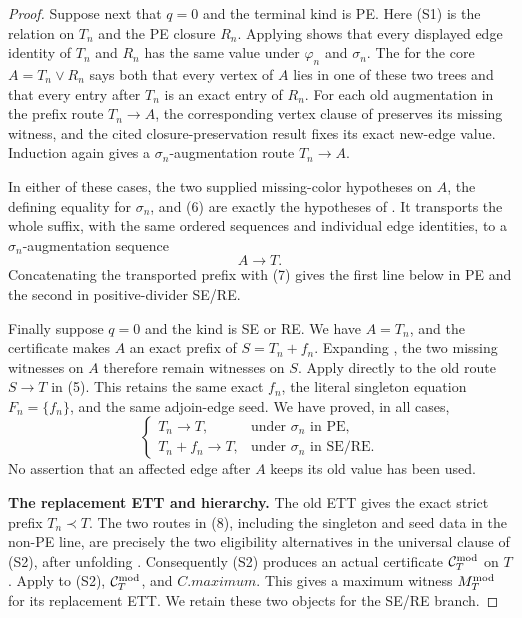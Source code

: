 \begin{proof}
Suppose next that \(q=0\) and the terminal kind is PE.  Here (S1) is the
 relation on \(T_n\) and the PE closure
\(R_n\).  Applying  shows that
every displayed edge identity of \(T_n\) and \(R_n\) has the same value
under \(\varphi_n\) and \(\sigma_n\).  The
 for the core \(A=T_n\vee R_n\) says both that
every vertex of \(A\) lies in one of these two trees and that every entry
after \(T_n\) is an exact entry of \(R_n\).  For each old augmentation in
the prefix route \(T_n\to A\), the corresponding vertex clause of
 preserves its missing witness, and the cited
closure-preservation result fixes its exact new-edge value.  Induction
again gives a \(\sigma_n\)-augmentation route \(T_n\to A\).

In either of these cases, the two supplied missing-color hypotheses on
\(A\), the defining equality for \(\sigma_n\), and (6) are exactly the
hypotheses of
.  It transports the
whole suffix, with the same ordered sequences and individual edge
identities, to a \(\sigma_n\)-augmentation sequence
\[
                         A\longrightarrow T.                  \tag{7}
\]
Concatenating the transported prefix with (7) gives the first line below
in PE and the second in positive-divider SE/RE.

Finally suppose \(q=0\) and the kind is SE or RE.  We have \(A=T_n\), and
the  certificate makes \(A\) an exact
prefix of \(S=T_n+f_n\).  Expanding , the two
missing witnesses on \(A\) therefore remain witnesses on \(S\).  Apply
 directly to the old
route \(S\to T\) in (5).  This retains the same exact \(f_n\), the literal
singleton equation \(F_n=\{f_n\}\), and the same adjoin-edge seed.  We have
proved, in all cases,
\[
\begin{cases}
 T_n\longrightarrow T,&\text{under }\sigma_n\text{ in PE},\\
 T_n+f_n\longrightarrow T,&\text{under }\sigma_n\text{ in SE/RE}.
\end{cases}                                                     \tag{8}
\]
No assertion that an affected edge after \(A\) keeps its old value has
been used.

\textbf{The replacement ETT and hierarchy.}
The old ETT gives the exact strict prefix \(T_n\prec T\).  The two routes
in (8), including the singleton and seed data in the non-PE line, are
precisely the two eligibility alternatives in the universal clause of
(S2), after unfolding .  Consequently (S2) produces
an actual  certificate
\(\mathcal C_T^{\rm mod}\) on \(T\).  Apply
 to (S2),
\(\mathcal C_T^{\rm mod}\), and \(C.\mathit{maximum}\).  This gives a
maximum witness \(M_T^{\rm mod}\) for its replacement ETT.  We retain
these two objects for the SE/RE branch.


\end{proof}

